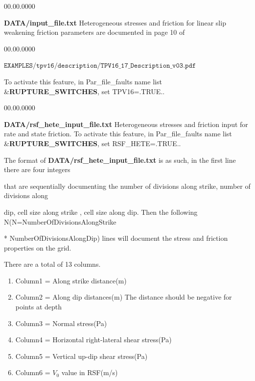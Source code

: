 \begin{lyxlist}{00.00.0000}
\item [{\textbf{DATA/input\_file.txt}}] Heterogeneous stresses and friction for
linear slip weakening friction
parameters are documented in page 10 of

\begin{lyxlist}{00.00.0000}
\item [{$\mathtt{EXAMPLES/tpv16/description/TPV16\_17\_Description\_v03.pdf}$}]~
\end{lyxlist}

To activate this feature, in Par\_file\_faults name list \&\textbf{RUPTURE\_SWITCHES}, set TPV16=.TRUE..

\end{lyxlist}
\begin{lyxlist}{00.00.0000}
\item [{\textbf{DATA/rsf\_hete\_input\_file.txt}}]  Heterogeneous stresses and friction input for
  rate and state friction.
To activate this feature, in Par\_file\_faults name list \&\textbf{RUPTURE\_SWITCHES}, set RSF\_HETE=.TRUE..

  The format of  {\textbf{DATA/rsf\_hete\_input\_file.txt}} is as such, in the first line there are four integers

  that are sequentially documenting the number of divisions along strike, number of divisions along

  dip, cell size along strike , cell size along dip. Then the following N(N=NumberOfDivisionsAlongStrike

  * NumberOfDivisionsAlongDip) lines will document the stress and friction properties on the grid.

  There are a total of 13 columns.
  \begin{enumerate}
  \item{Column1} = Along strike distance(m)

  \item{Column2} = Along dip distances(m) The distance should be negative for points at depth

  \item{Column3} = Normal stress(Pa)

  \item{Column4} = Horizontal right-lateral shear stress(Pa)

  \item{Column5} = Vertical up-dip shear stress(Pa)

  \item{Column6} = $V_0$ value in RSF(m/s)


\end{enumerate}
\end{lyxlist}
